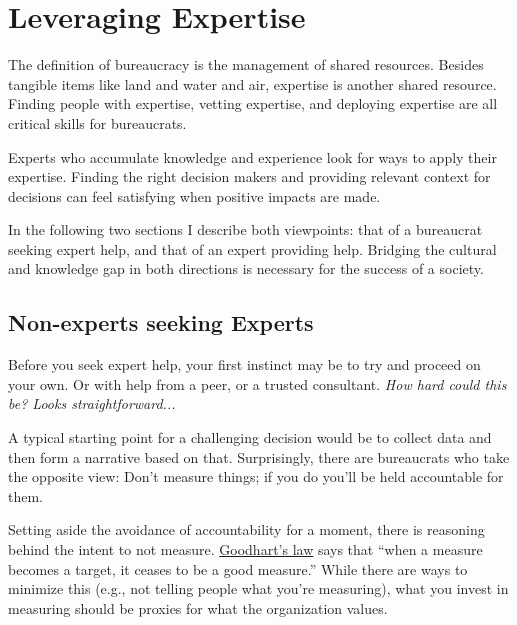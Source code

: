 \section{Leveraging Expertise\label{sec:expertise}}



The definition of \gls{bureaucracy} is the management of shared resources. Besides tangible items like land and water and air, expertise is another shared resource. Finding people with expertise, vetting expertise, and deploying expertise are all critical skills for bureaucrats. 

Experts who accumulate knowledge and experience look for ways to apply their expertise. Finding the right decision makers and providing relevant context for decisions can feel satisfying when positive impacts are made. 


In the following two sections I describe both viewpoints: that of a bureaucrat seeking expert help, and that of an expert providing help. Bridging the cultural and knowledge gap in both directions is necessary for the success of a society.

\subsection*{Non-experts seeking Experts}

Before you seek expert help, your first instinct may be to try and proceed on your own. Or with help from a peer, or a trusted consultant. \textit{How hard could this be? Looks straightforward...}

A typical starting point for a challenging decision would be to collect data and then form a narrative based on that. Surprisingly, there are bureaucrats who take the opposite view: Don't measure things; if you do you'll be held accountable for them. 

Setting aside the avoidance of accountability for a moment, there is reasoning behind the intent to not measure.  \href{https://en.wikipedia.org/wiki/Goodhart\%27s_law}{Goodhart's law}
says that ``when a measure becomes a target, it ceases to be a good measure.'' While there are ways to minimize this (e.g., not telling people what you're measuring), what you invest in measuring should be proxies for what the organization values.


